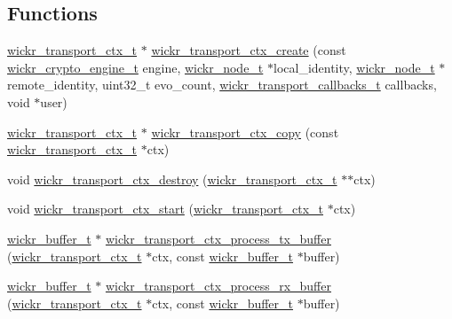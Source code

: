 \subsection*{Functions}
\begin{DoxyCompactItemize}
\item 
\mbox{\hyperlink{structwickr__transport__ctx}{wickr\+\_\+transport\+\_\+ctx\+\_\+t}} $\ast$ \mbox{\hyperlink{group__wickr__transport__ctx_ga4731758cf20b71d4469c74904bf662c0}{wickr\+\_\+transport\+\_\+ctx\+\_\+create}} (const \mbox{\hyperlink{structwickr__crypto__engine}{wickr\+\_\+crypto\+\_\+engine\+\_\+t}} engine, \mbox{\hyperlink{structwickr__node}{wickr\+\_\+node\+\_\+t}} $\ast$local\+\_\+identity, \mbox{\hyperlink{structwickr__node}{wickr\+\_\+node\+\_\+t}} $\ast$remote\+\_\+identity, uint32\+\_\+t evo\+\_\+count, \mbox{\hyperlink{structwickr__transport__callbacks}{wickr\+\_\+transport\+\_\+callbacks\+\_\+t}} callbacks, void $\ast$user)
\item 
\mbox{\hyperlink{structwickr__transport__ctx}{wickr\+\_\+transport\+\_\+ctx\+\_\+t}} $\ast$ \mbox{\hyperlink{group__wickr__transport__ctx_gaa49b2cf44bcb02d656598a17e5ae1c52}{wickr\+\_\+transport\+\_\+ctx\+\_\+copy}} (const \mbox{\hyperlink{structwickr__transport__ctx}{wickr\+\_\+transport\+\_\+ctx\+\_\+t}} $\ast$ctx)
\item 
void \mbox{\hyperlink{group__wickr__transport__ctx_gabe547b01f4f02efea3f518d7445a71ee}{wickr\+\_\+transport\+\_\+ctx\+\_\+destroy}} (\mbox{\hyperlink{structwickr__transport__ctx}{wickr\+\_\+transport\+\_\+ctx\+\_\+t}} $\ast$$\ast$ctx)
\item 
void \mbox{\hyperlink{group__wickr__transport__ctx_gaee74761e31d5f0a6fc97e2ccf5ac1e29}{wickr\+\_\+transport\+\_\+ctx\+\_\+start}} (\mbox{\hyperlink{structwickr__transport__ctx}{wickr\+\_\+transport\+\_\+ctx\+\_\+t}} $\ast$ctx)
\item 
\mbox{\hyperlink{structwickr__buffer}{wickr\+\_\+buffer\+\_\+t}} $\ast$ \mbox{\hyperlink{group__wickr__transport__ctx_ga60dad2360ba29d8c131093a4e9b69057}{wickr\+\_\+transport\+\_\+ctx\+\_\+process\+\_\+tx\+\_\+buffer}} (\mbox{\hyperlink{structwickr__transport__ctx}{wickr\+\_\+transport\+\_\+ctx\+\_\+t}} $\ast$ctx, const \mbox{\hyperlink{structwickr__buffer}{wickr\+\_\+buffer\+\_\+t}} $\ast$buffer)
\item 
\mbox{\hyperlink{structwickr__buffer}{wickr\+\_\+buffer\+\_\+t}} $\ast$ \mbox{\hyperlink{group__wickr__transport__ctx_gaa0af661e209143c19633e1244ac59db4}{wickr\+\_\+transport\+\_\+ctx\+\_\+process\+\_\+rx\+\_\+buffer}} (\mbox{\hyperlink{structwickr__transport__ctx}{wickr\+\_\+transport\+\_\+ctx\+\_\+t}} $\ast$ctx, const \mbox{\hyperlink{structwickr__buffer}{wickr\+\_\+buffer\+\_\+t}} $\ast$buffer)
$$
\end{DoxyCompactItemize}
